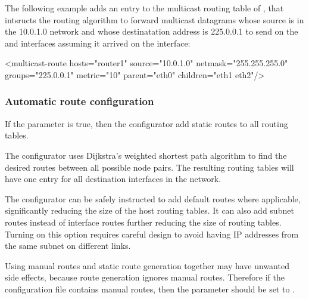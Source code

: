 The following example adds an entry to the multicast routing table of ,
that intsructs the routing algorithm to forward multicast datagrams whose source
is in the 10.0.1.0 network and whose destinatation address is 225.0.0.1 to
send on the  and  interfaces assuming it arrived on the
 interface:

\begin{XML}
<multicast-route hosts="router1" source="10.0.1.0" netmask="255.255.255.0"
                 groups="225.0.0.1" metric="10"
                 parent="eth0" children="eth1 eth2"/>
\end{XML}

\subsubsection*{Automatic route configuration}

If the  parameter is true, then
the configurator add static routes to all routing tables.

The configurator uses Dijkstra's weighted shortest path algorithm to find
the desired routes between all possible node pairs. The resulting
routing tables will have one entry for all destination interfaces in the
network.


The configurator can be safely instructed to add default routes
where applicable, significantly reducing the size of the host routing
tables. It can also add subnet routes instead of interface routes further
reducing the size of routing tables. Turning on this option requires
careful design to avoid having IP addresses from the same subnet on
different links.


\begin{caution}
Using manual routes and static route generation
together may have unwanted side effects, because route generation ignores
manual routes. Therefore if the configuration file contains
manual routes, then the  parameter should be set
to .
\end{caution}

